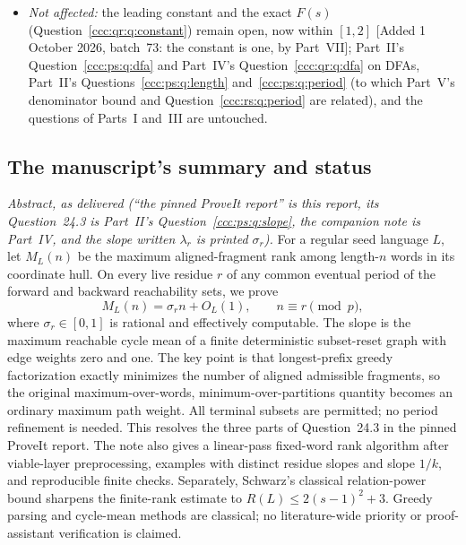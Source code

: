 \documentclass[11pt,letterpaper]{article}
\theoremstyle{definition}
\theoremstyle{remark}
\newcommand{\waddsevthree}[1]{\textup{[}Added 1 October 2026, batch~73: #1\textup{]}}
\begin{document}
\begin{itemize}[leftmargin=1.4em,itemsep=1pt]
 (Theorem~\ref{ccc:rs:thm:schwarz}); maximum cycle means and Karp's
 algorithm~\cite{KarpCycle}; greedy parsing (Crochemore--Langiu--Mignosi,
 De~Luca--Fici); represented-interval machinery (Manzoni--Vanneschi--Mauri);
 Part~IV's lower family.
\item \emph{Not affected:} the leading constant and the exact $F(s)$
 (Question~\ref{ccc:qr:q:constant}) remain open, now within $[1,2]$
 \waddsevthree{the constant is one, by Part~VII}; Part~II's
 Question~\ref{ccc:ps:q:dfa} and Part~IV's Question~\ref{ccc:qr:q:dfa} on
 DFAs, Part~II's Questions~\ref{ccc:ps:q:length} and~\ref{ccc:ps:q:period}
 (to which Part~V's denominator bound and Question~\ref{ccc:rs:q:period} are
 related), and the questions of Parts~I and~III are untouched.
\end{itemize}

\subsection{The manuscript's summary and status}\label{ccc:rs:sec:abstract}

\emph{Abstract, as delivered (``the pinned ProveIt report'' is this report,
its Question~24.3 is Part~II's Question~\ref{ccc:ps:q:slope}, the companion
note is Part~IV, and the slope written $\lambda_r$ is printed $\sigma_r$).}
For a regular seed language $L$, let $M_L(n)$ be the maximum aligned-fragment
rank among length-$n$ words in its coordinate hull. On every live residue $r$
of any common eventual period of the forward and backward reachability sets,
we prove
\[
M_L(n)=\sigma_r n+O_L(1),\qquad n\equiv r\pmod p,
\]
where $\sigma_r\in[0,1]$ is rational and effectively computable. The slope is
the maximum reachable cycle mean of a finite deterministic subset-reset graph
with edge weights zero and one. The key point is that longest-prefix greedy
factorization exactly minimizes the number of aligned admissible fragments, so
the original maximum-over-words, minimum-over-partitions quantity becomes an
ordinary maximum path weight. All terminal subsets are permitted; no period
refinement is needed. This resolves the three parts of Question~24.3 in the
pinned ProveIt report. The note also gives a linear-pass fixed-word rank
algorithm after viable-layer preprocessing, examples with distinct residue
slopes and slope $1/k$, and reproducible finite checks. Separately, Schwarz's
classical relation-power bound sharpens the finite-rank estimate to
$R(L)\le2(s-1)^2+3$. Greedy parsing and cycle-mean methods are classical; no
literature-wide priority or proof-assistant verification is claimed.
\end{document}
